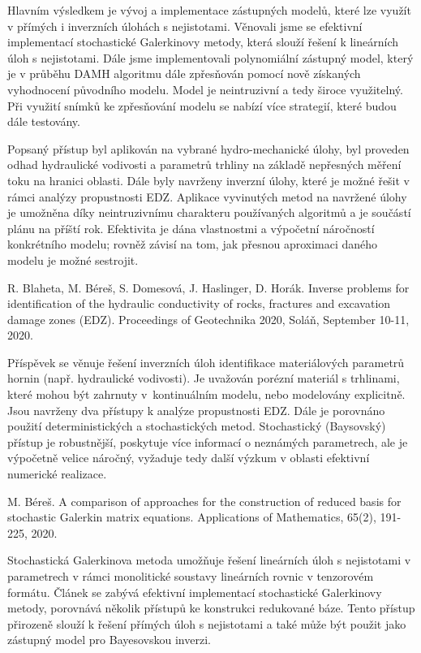 \documentclass[11pt,a4paper]{article}
\begin{document}
\begin{onehalfspacing}
Hlavním výsledkem je vývoj a implementace zástupných modelů, které lze využít v přímých i inverzních úlohách s nejistotami. Věnovali jsme se efektivní implementací stochastické Galerkinovy metody, která slouží řešení k lineárních úloh s nejistotami. Dále jsme implementovali polynomiální zástupný model, který je v průběhu DAMH algoritmu dále zpřesňován pomocí nově získaných vyhodnocení původního modelu. Model je neintruzivní a tedy široce využitelný. Při využití snímků ke zpřesňování modelu se nabízí více strategií, které budou dále testovány.

Popsaný přístup byl aplikován na vybrané hydro-mechanické úlohy, byl proveden odhad hydraulické vodivosti a parametrů trhliny na základě nepřesných měření toku na hranici oblasti. Dále byly navrženy inverzní úlohy, které je možné řešit v rámci analýzy propustnosti EDZ. Aplikace vyvinutých metod na navržené úlohy je umožněna díky neintruzivnímu charakteru používaných algoritmů a je součástí plánu na příští rok. Efektivita je dána vlastnostmi a výpočetní náročností konkrétního modelu; rovněž závisí na tom, jak přesnou aproximaci daného modelu je možné sestrojit.

\vspace{2ex}

\noindent

R. Blaheta, M. Béreš, S. Domesová, J. Haslinger, D. Horák. Inverse problems for identification of the hydraulic conductivity of rocks, fractures and excavation damage zones (EDZ). Proceedings of Geotechnika 2020, Soláň, September 10-11, 2020.

Příspěvek se věnuje řešení inverzních úloh identifikace materiálových parametrů hornin (např. hydraulické vodivosti). Je uvažován porézní materiál s trhlinami, které mohou být zahrnuty v~kontinuálním modelu, nebo modelovány explicitně. Jsou navrženy dva přístupy k analýze propustnosti EDZ. Dále je porovnáno použití deterministických a stochastických metod. Stochastický (Baysovský) přístup je robustnější, poskytuje více informací o neznámých parametrech, ale je výpočetně velice náročný, vyžaduje tedy další výzkum v oblasti efektivní numerické realizace.

\vspace{2ex}
\noindent
M. Béreš. A comparison of approaches for the construction of reduced basis for stochastic Galerkin matrix equations. Applications of Mathematics, 65(2), 191-225, 2020.

Stochastická Galerkinova metoda umožňuje řešení lineárních úloh s nejistotami v parametrech v rámci monolitické soustavy lineárních rovnic v tenzorovém formátu. Článek se zabývá efektivní implementací stochastické Galerkinovy metody, porovnává několik přístupů ke konstrukci redukované báze. Tento přístup přirozeně slouží k řešení přímých úloh s nejistotami a také může být použit jako zástupný model pro Bayesovskou inverzi.


\end{onehalfspacing}
\end{document}
